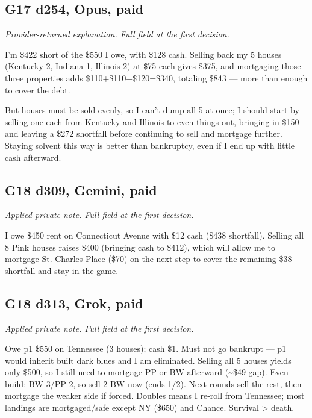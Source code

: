 \subsection*{G17 d254, Opus, paid}
{\small\textit{Provider-returned explanation. Full field at the first decision.}\par I'm \$422 short of the \$550 I owe, with \$128 cash. Selling back my 5 houses (Kentucky 2, Indiana 1, Illinois 2) at \$75 each gives \$375, and mortgaging those three properties adds \$110+\$110+\$120=\$340, totaling \$843 — more than enough to cover the debt.\par 
\par 
But houses must be sold evenly, so I can't dump all 5 at once; I should start by selling one each from Kentucky and Illinois to even things out, bringing in \$150 and leaving a \$272 shortfall before continuing to sell and mortgage further. Staying solvent this way is better than bankruptcy, even if I end up with little cash afterward.\par 
\par 
\par}

\subsection*{G18 d309, Gemini, paid}
{\small\textit{Applied private note. Full field at the first decision.}\par I owe \$450 rent on Connecticut Avenue with \$12 cash (\$438 shortfall). Selling all 8 Pink houses raises \$400 (bringing cash to \$412), which will allow me to mortgage St. Charles Place (\$70) on the next step to cover the remaining \$38 shortfall and stay in the game.\par}

\subsection*{G18 d313, Grok, paid}
{\small\textit{Applied private note. Full field at the first decision.}\par Owe p1 \$550 on Tennessee (3 houses); cash \$1. Must not go bankrupt — p1 would inherit built dark blues and I am eliminated. Selling all 5 houses yields only \$500, so I still need to mortgage PP or BW afterward (\textasciitilde{}\$49 gap). Even-build: BW 3/PP 2, so sell 2 BW now (ends 1/2). Next rounds sell the rest, then mortgage the weaker side if forced. Doubles means I re-roll from Tennessee; most landings are mortgaged/safe except NY (\$650) and Chance. Survival > death.\par}

